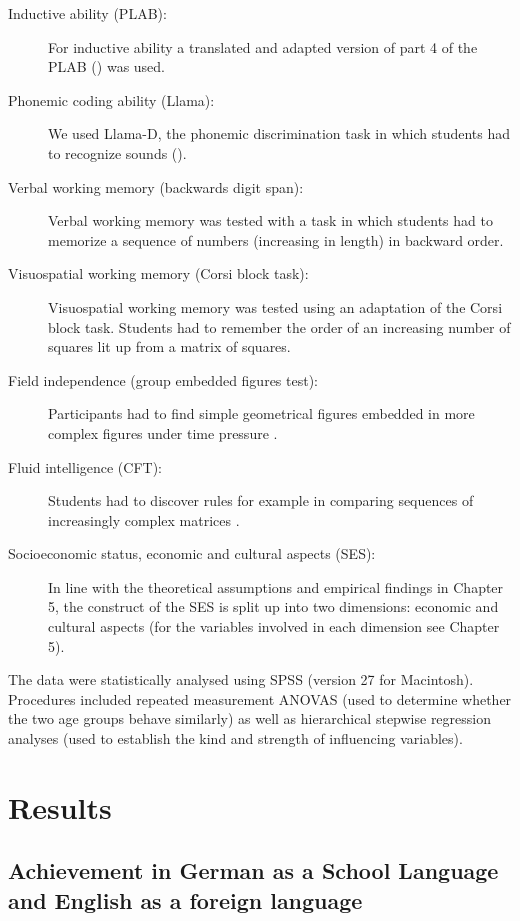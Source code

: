 \documentclass[output=paper]{langsci/langscibook}
\begin{document}
\begin{description}
\item[Inductive ability (PLAB):]
For inductive ability a translated and adapted version of part 4 of the PLAB (\citealt{PimsleurEtAl2004}) was used.
\item[Phonemic coding ability (Llama):]
We used Llama-D, the phonemic discrimination task in which students had to recognize sounds (\citealt{MearaEtAl2001}).
\item[Verbal working memory (backwards digit span):]
Verbal working memory was tested with a task in which students had to memorize a sequence of numbers (increasing in length) in backward order.
\item[Visuospatial working memory (Corsi block task):]
Visuospatial working memory was tested using an adaptation of the Corsi block task. Students had to remember the order of an increasing number of squares lit up from a matrix of squares.
\item[Field independence (group embedded figures test):]
Participants had to find simple geometrical figures embedded in more complex figures under time pressure \citep{OltmanEtAl1971}.
\item[Fluid intelligence (CFT):]
Students had to discover rules for example in comparing sequences of increasingly complex matrices \citep{Weiss2006}.
\item[Socioeconomic status, economic and cultural aspects (SES):]
In line with the theoretical assumptions and empirical findings in Chapter 5, the construct of the SES is split up into two dimensions: economic and cultural aspects (for the variables involved in each dimension see Chapter 5).
\end{description}

The data were statistically analysed using SPSS (version 27 for Macintosh). Procedures included repeated measurement ANOVAS (used to determine whether the two age groups behave similarly) as well as hierarchical stepwise regression analyses (used to establish the kind and strength of influencing variables).

\section{Results}\label{sec:09:4}
\subsection{Achievement in German as a School Language and English as a foreign language} %
\end{document}
